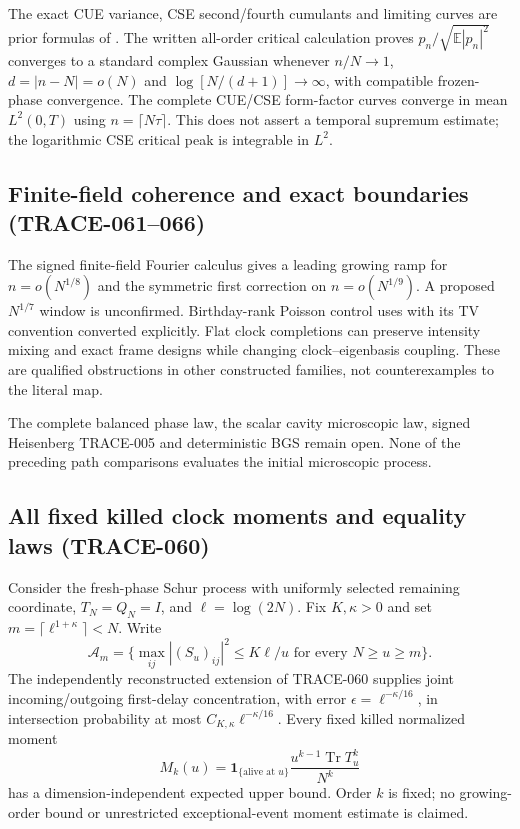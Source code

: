 The exact CUE variance, CSE second/fourth cumulants and limiting curves
are prior formulas of \cite{HSW1999}. The written all-order critical
calculation proves $p_n/\sqrt{\mathbb E|p_n|^2}$ converges to a standard
complex Gaussian whenever $n/N\to1$, $d=|n-N|=o(N)$ and
$\log[N/(d+1)]\to\infty$, with compatible frozen-phase convergence.
The complete CUE/CSE form-factor curves converge in mean $L^2(0,T)$ using
$n=\lceil N\tau\rceil$. This does not assert a temporal supremum estimate;
the logarithmic CSE critical peak is integrable in $L^2$.

\subsection{Finite-field coherence and exact boundaries (TRACE-061--066)}
The signed finite-field Fourier calculus gives a leading growing ramp for
$n=o(N^{1/8})$ and the symmetric first correction on $n=o(N^{1/9})$.
A proposed $N^{1/7}$ window is unconfirmed. Birthday-rank Poisson control
uses \cite{AGG1989} with its TV convention converted explicitly.
Flat clock completions can preserve intensity mixing and exact frame designs
while changing clock--eigenbasis coupling. These are qualified obstructions
in other constructed families, not counterexamples to the literal map.

The complete balanced phase law, the scalar cavity microscopic law, signed
Heisenberg TRACE-005 and deterministic BGS remain open. None of the preceding
path comparisons evaluates the initial microscopic process.

\subsection{All fixed killed clock moments and equality laws (TRACE-060)}
Consider the fresh-phase Schur process with uniformly selected remaining
coordinate, $T_N=Q_N=I$, and $\ell=\log(2N)$. Fix $K,\kappa>0$ and set
$m=\lceil\ell^{1+\kappa}\rceil<N$. Write
\[
 \mathcal A_m=\{\max_{ij}|(S_u)_{ij}|^2\le K\ell/u
                      \text{ for every }N\ge u\ge m\}.
\]
The independently reconstructed extension of TRACE-060 supplies joint
incoming/outgoing first-delay concentration, with error
$\epsilon=\ell^{-\kappa/16}$, in intersection probability at most
$C_{K,\kappa}\ell^{-\kappa/16}$. Every fixed killed normalized moment
\[
 M_k(u)=\mathbf1_{\{\text{alive at }u\}}
                 \frac{u^{k-1}\operatorname{Tr}T_u^k}{N^k}
\]
has a dimension-independent expected upper bound. Order $k$ is fixed;
no growing-order bound or unrestricted exceptional-event moment estimate
is claimed.

